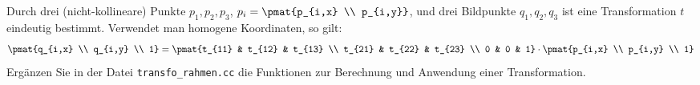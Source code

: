 %
Durch drei (nicht-kollineare) Punkte $p_1, p_2, p_3$, $p_i =
\pmat{p_{i,x} \\ p_{i,y}}$, und drei Bildpunkte $q_1, q_2, q_3$ ist eine 
Transformation $t$ eindeutig bestimmt. Verwendet man homogene 
Koordinaten, so gilt:
$$\pmat{q_{i,x} \\ q_{i,y} \\ 1} = \pmat{t_{11} & t_{12} & t_{13} \\
  t_{21} & t_{22} & t_{23} \\ 0 & 0 & 1} \cdot \pmat{p_{i,x} \\
  p_{i,y} \\ 1}$$
Ergänzen Sie in der Datei \texttt{transfo\_rahmen.cc} die Funktionen zur 
Berechnung und Anwendung einer Transformation.
